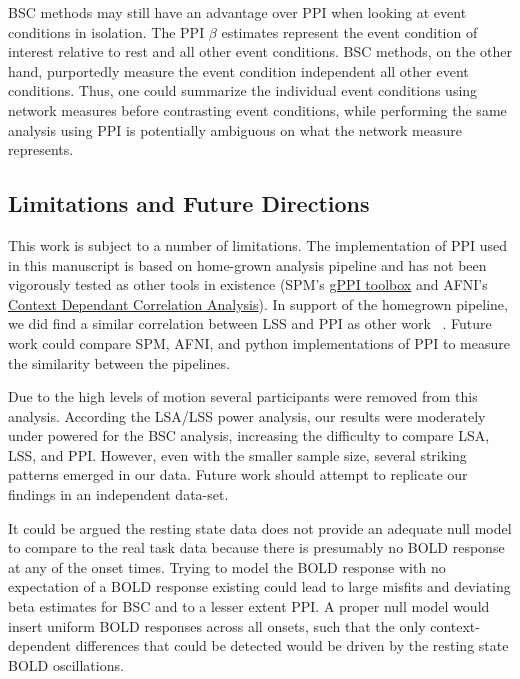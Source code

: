 \documentclass[phd,figures,tables,ackpage,abstractpage,publicabstractpage]{uithesis}
\begin{document}
BSC methods may still have an advantage over PPI when looking at event conditions in isolation.
The PPI $\beta$ estimates represent the event condition of interest relative to rest and all other
event conditions.
BSC methods, on the other hand, purportedly measure the event condition independent all other event conditions.
Thus, one could summarize the individual event conditions using network measures before contrasting event conditions,
while performing the same analysis using PPI is potentially ambiguous on what the network measure represents.

\subsection{Limitations and Future Directions}

This work is subject to a number of limitations.
The implementation of PPI used in this manuscript is based on
home-grown analysis pipeline and has not been vigorously tested
as other tools in existence (SPM's \href{https://www.nitrc.org/projects/gppi}{gPPI toolbox}
and AFNI's \href{https://afni.nimh.nih.gov/CD-CorrAna}{Context Dependant Correlation Analysis}).
In support of the homegrown pipeline, we did find a similar correlation between LSS and PPI as
other work ~\cite{Di2019a}.
Future work could compare SPM, AFNI, and python implementations of PPI to measure the similarity
between the pipelines.

Due to the high levels of motion several participants were removed from this analysis.
According the LSA/LSS power analysis, our results were moderately under powered for the BSC analysis,
increasing the difficulty to compare LSA, LSS, and PPI.
However, even with the smaller sample size, several striking patterns emerged in our data.
Future work should attempt to replicate our findings in an independent data-set.

It could be argued the resting state data does not provide an adequate null model
to compare to the real task data because there is presumably no BOLD response at any
of the onset times.
Trying to model the BOLD response with no expectation of a BOLD response existing could lead
to large misfits and deviating beta estimates for BSC and to a lesser extent PPI.
A proper null model would insert uniform BOLD responses across all onsets, such that
the only context-dependent differences that could be detected would be driven by the
resting state BOLD oscillations.
\end{document}

